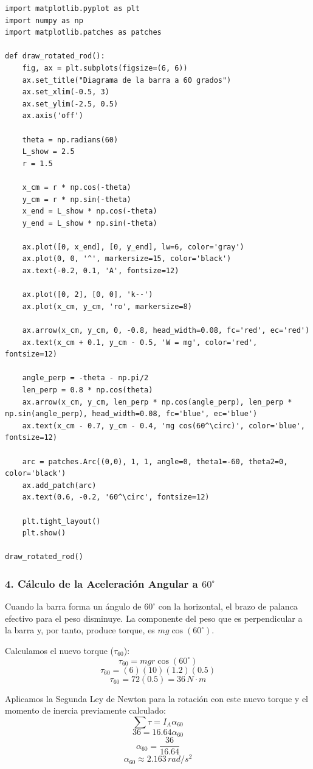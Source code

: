 \documentclass[12pt, a4paper]{article}
\begin{document}
\begin{lstlisting}
import matplotlib.pyplot as plt
import numpy as np
import matplotlib.patches as patches

def draw_rotated_rod():
    fig, ax = plt.subplots(figsize=(6, 6))
    ax.set_title("Diagrama de la barra a 60 grados")
    ax.set_xlim(-0.5, 3)
    ax.set_ylim(-2.5, 0.5)
    ax.axis('off')

    theta = np.radians(60)
    L_show = 2.5
    r = 1.5

    x_cm = r * np.cos(-theta)
    y_cm = r * np.sin(-theta)
    x_end = L_show * np.cos(-theta)
    y_end = L_show * np.sin(-theta)

    ax.plot([0, x_end], [0, y_end], lw=6, color='gray')
    ax.plot(0, 0, '^', markersize=15, color='black')
    ax.text(-0.2, 0.1, 'A', fontsize=12)

    ax.plot([0, 2], [0, 0], 'k--')
    ax.plot(x_cm, y_cm, 'ro', markersize=8)

    ax.arrow(x_cm, y_cm, 0, -0.8, head_width=0.08, fc='red', ec='red')
    ax.text(x_cm + 0.1, y_cm - 0.5, 'W = mg', color='red', fontsize=12)

    angle_perp = -theta - np.pi/2
    len_perp = 0.8 * np.cos(theta)
    ax.arrow(x_cm, y_cm, len_perp * np.cos(angle_perp), len_perp * np.sin(angle_perp), head_width=0.08, fc='blue', ec='blue')
    ax.text(x_cm - 0.7, y_cm - 0.4, 'mg cos(60^\circ)', color='blue', fontsize=12)

    arc = patches.Arc((0,0), 1, 1, angle=0, theta1=-60, theta2=0, color='black')
    ax.add_patch(arc)
    ax.text(0.6, -0.2, '60^\circ', fontsize=12)

    plt.tight_layout()
    plt.show()

draw_rotated_rod()
\end{lstlisting}

\subsubsection*{4. Cálculo de la Aceleración Angular a $60^\circ$}
Cuando la barra forma un ángulo de $60^\circ$ con la horizontal, el brazo de palanca efectivo para el peso disminuye. La componente del peso que es perpendicular a la barra y, por tanto, produce torque, es $mg \cos(60^\circ)$.

Calculamos el nuevo torque ($\tau_{60}$):
$$\tau_{60} = m g r \cos(60^\circ)$$
$$\tau_{60} = (6)(10)(1.2)(0.5)$$
$$\tau_{60} = 72(0.5) = 36 \, \si{N\cdot m}$$

Aplicamos la Segunda Ley de Newton para la rotación con este nuevo torque y el momento de inercia previamente calculado:
$$\sum \tau = I_A \alpha_{60}$$
$$36 = 16.64 \alpha_{60}$$
$$\alpha_{60} = \frac{36}{16.64}$$
$$\alpha_{60} \approx 2.163 \, \si{rad/s^2}$$
\end{document}
